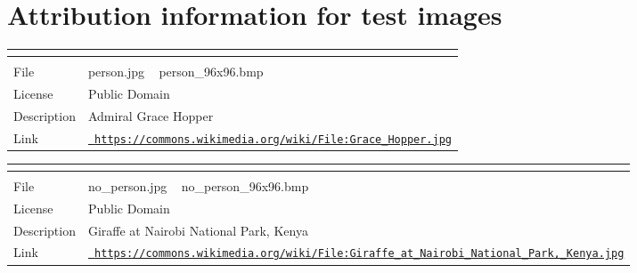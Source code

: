 \chapter{Attribution information for test images}
\hypertarget{md__arduino_2_get_started_with_machine_learning_on_arduino_2tflite-micro-arduino-examples-main_2086c03fa365c0f9b6d85cf7e4d1bf622}{}\label{md__arduino_2_get_started_with_machine_learning_on_arduino_2tflite-micro-arduino-examples-main_2086c03fa365c0f9b6d85cf7e4d1bf622}
\label{md__arduino_2_get_started_with_machine_learning_on_arduino_2tflite-micro-arduino-examples-main_2086c03fa365c0f9b6d85cf7e4d1bf622_autotoc_md23}%
%


\tabulinesep=1mm
\begin{longtabu}spread 0pt [c]{*{2}{|X[-1]}|}
\hline
\cellcolor{\tableheadbgcolor}\textbf{ }&\cellcolor{\tableheadbgcolor}\textbf{ }\\
\endfirsthead
\hline
\endfoot
\hline
\cellcolor{\tableheadbgcolor}\textbf{ }&\cellcolor{\tableheadbgcolor}\textbf{ }\\
\endhead
File   &person.\+jpg ~\newline
 person\+\_\+96x96.\+bmp    \\
License   &Public Domain    \\
Description   &Admiral Grace Hopper    \\
Link   &\href{https://commons.wikimedia.org/wiki/File:Grace_Hopper.jpg}{\texttt{ https\+://commons.\+wikimedia.\+org/wiki/\+File\+:\+Grace\+\_\+\+Hopper.\+jpg}}   \\
\end{longtabu}


\tabulinesep=1mm
\begin{longtabu}spread 0pt [c]{*{2}{|X[-1]}|}
\hline
\cellcolor{\tableheadbgcolor}\textbf{ }&\cellcolor{\tableheadbgcolor}\textbf{ }\\
\endfirsthead
\hline
\endfoot
\hline
\cellcolor{\tableheadbgcolor}\textbf{ }&\cellcolor{\tableheadbgcolor}\textbf{ }\\
\endhead
File   &no\+\_\+person.\+jpg ~\newline
 no\+\_\+person\+\_\+96x96.\+bmp    \\
License   &Public Domain    \\
Description   &Giraffe at Nairobi National Park, Kenya    \\
Link   &\href{https://commons.wikimedia.org/wiki/File:Giraffe_at_Nairobi_National_Park,_Kenya.jpg}{\texttt{ https\+://commons.\+wikimedia.\+org/wiki/\+File\+:\+Giraffe\+\_\+at\+\_\+\+Nairobi\+\_\+\+National\+\_\+\+Park,\+\_\+\+Kenya.\+jpg}}   \\
\end{longtabu}
